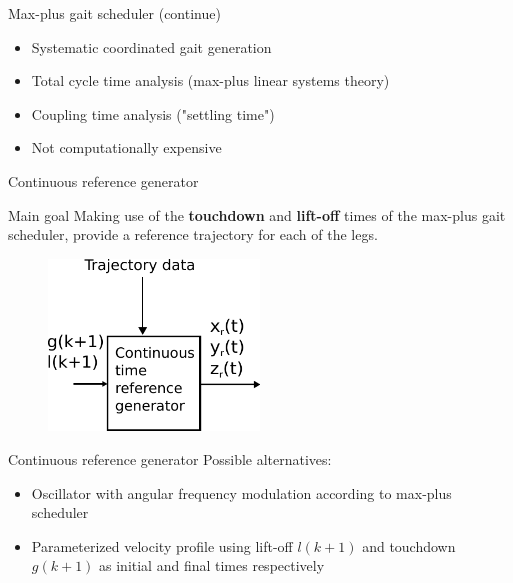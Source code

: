 \documentclass[10pt]{beamer}
\begin{document}
\begin{frame}{Max-plus gait scheduler (continue)}
\begin{itemize}
	\setlength\itemsep{2em}
	\item Systematic coordinated gait generation 
	\item Total cycle time analysis (max-plus linear systems theory)
	\item Coupling time analysis ("settling time")
	\item Not computationally expensive
\end{itemize}	
\end{frame}

\begin{frame}{Continuous reference generator}
	\begin{block}{Main goal}
		\Large Making use of the \textbf{touchdown} and \textbf{lift-off} times of the max-plus gait scheduler, provide a reference trajectory for each of the legs.
	\end{block}
	\begin{figure}[H]
		\includegraphics[width=0.5\textwidth]{AngularFrequency.pdf}
	\end{figure}
\end{frame}

\begin{frame}{Continuous reference generator}
Possible alternatives:
\begin{itemize}\setlength\itemsep{2em}
	\item Oscillator with angular frequency modulation according to max-plus scheduler
	\item Parameterized velocity profile using lift-off $l(k+1)$ and touchdown $g(k+1)$ as initial and final times respectively
\end{itemize}
\end{frame}
\end{document}
